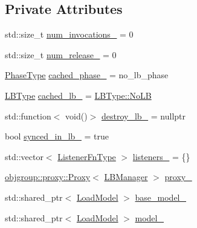 \subsection*{Private Attributes}
\begin{DoxyCompactItemize}
\item 
std\+::size\+\_\+t \hyperlink{structvt_1_1vrt_1_1collection_1_1balance_1_1_l_b_manager_a216981a9e47bf75c8d734d66d98b516a}{num\+\_\+invocations\+\_\+} = 0
\item 
std\+::size\+\_\+t \hyperlink{structvt_1_1vrt_1_1collection_1_1balance_1_1_l_b_manager_a93855ddcd9842e951987256e81aa8802}{num\+\_\+release\+\_\+} = 0
\item 
\hyperlink{namespacevt_a46ce6733d5cdbd735d561b7b4029f6d7}{Phase\+Type} \hyperlink{structvt_1_1vrt_1_1collection_1_1balance_1_1_l_b_manager_aa15bf182a0d70f1fc756ac8893422777}{cached\+\_\+phase\+\_\+} = no\+\_\+lb\+\_\+phase
\item 
\hyperlink{namespacevt_1_1vrt_1_1collection_1_1balance_ac4f99693509affcc67db182d4aad9b5c}{L\+B\+Type} \hyperlink{structvt_1_1vrt_1_1collection_1_1balance_1_1_l_b_manager_aa21ee592ddcc09c269e546c0ebf47fd3}{cached\+\_\+lb\+\_\+} = \hyperlink{namespacevt_1_1vrt_1_1collection_1_1balance_ac4f99693509affcc67db182d4aad9b5cad12268b59a4f1098aee001f9a1750020}{L\+B\+Type\+::\+No\+LB}
\item 
std\+::function$<$ void()$>$ \hyperlink{structvt_1_1vrt_1_1collection_1_1balance_1_1_l_b_manager_a31af388e759240311470c17ec569155c}{destroy\+\_\+lb\+\_\+} = nullptr
\item 
bool \hyperlink{structvt_1_1vrt_1_1collection_1_1balance_1_1_l_b_manager_aa47677efcfd106dbd8ab387b1a8e0c21}{synced\+\_\+in\+\_\+lb\+\_\+} = true
\item 
std\+::vector$<$ \hyperlink{structvt_1_1vrt_1_1collection_1_1balance_1_1_l_b_manager_a1bb65b50c7cefb8c139a9f40a83ca18b}{Listener\+Fn\+Type} $>$ \hyperlink{structvt_1_1vrt_1_1collection_1_1balance_1_1_l_b_manager_a361d27be100f0ab1d7290c9d5565f845}{listeners\+\_\+} = \{\}
\item 
\hyperlink{structvt_1_1objgroup_1_1proxy_1_1_proxy}{objgroup\+::proxy\+::\+Proxy}$<$ \hyperlink{structvt_1_1vrt_1_1collection_1_1balance_1_1_l_b_manager}{L\+B\+Manager} $>$ \hyperlink{structvt_1_1vrt_1_1collection_1_1balance_1_1_l_b_manager_a4fef6bf68a7aee9980270ceeb5df0c2b}{proxy\+\_\+}
\item 
std\+::shared\+\_\+ptr$<$ \hyperlink{classvt_1_1vrt_1_1collection_1_1balance_1_1_load_model}{Load\+Model} $>$ \hyperlink{structvt_1_1vrt_1_1collection_1_1balance_1_1_l_b_manager_ace781095ef59c156a0b23dea6dea70db}{base\+\_\+model\+\_\+}
\item 
std\+::shared\+\_\+ptr$<$ \hyperlink{classvt_1_1vrt_1_1collection_1_1balance_1_1_load_model}{Load\+Model} $>$ \hyperlink{structvt_1_1vrt_1_1collection_1_1balance_1_1_l_b_manager_a4298255e00b2012d3417a63130dc91c3}{model\+\_\+}
\end{DoxyCompactItemize}

